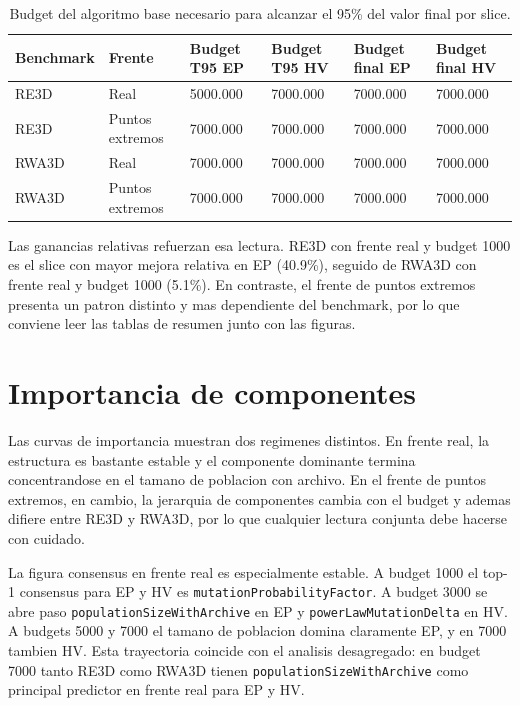 \documentclass[11pt,a4paper]{article}
\begin{document}
{\scriptsize
\begin{table}[p]
\centering
\caption{Budget del algoritmo base necesario para alcanzar el 95\% del valor final por slice.}
\label{tab:budget_t95}
\begin{tabular}{llllll}
\toprule
Benchmark & Frente & Budget T95 EP & Budget T95 HV & Budget final EP & Budget final HV \\
\midrule
RE3D & Real & 5000.000 & 7000.000 & 7000.000 & 7000.000 \\
RE3D & Puntos extremos & 7000.000 & 7000.000 & 7000.000 & 7000.000 \\
RWA3D & Real & 7000.000 & 7000.000 & 7000.000 & 7000.000 \\
RWA3D & Puntos extremos & 7000.000 & 7000.000 & 7000.000 & 7000.000 \\
\bottomrule
\end{tabular}
\end{table}

}

Las ganancias relativas refuerzan esa lectura. RE3D con frente real y budget 1000 es el slice con mayor mejora relativa en EP (40.9\%), seguido de RWA3D con frente real y budget 1000 (5.1\%). En contraste, el frente de puntos extremos presenta un patron distinto y mas dependiente del benchmark, por lo que conviene leer las tablas de resumen junto con las figuras.

\section{Importancia de componentes}

Las curvas de importancia muestran dos regimenes distintos. En frente real, la estructura es bastante estable y el componente dominante termina concentrandose en el tamano de poblacion con archivo. En el frente de puntos extremos, en cambio, la jerarquia de componentes cambia con el budget y ademas difiere entre RE3D y RWA3D, por lo que cualquier lectura conjunta debe hacerse con cuidado.

La figura consensus en frente real es especialmente estable. A budget 1000 el top-1 consensus para EP y HV es \texttt{mutationProbabilityFactor}. A budget 3000 se abre paso \texttt{populationSizeWithArchive} en EP y \texttt{powerLawMutationDelta} en HV. A budgets 5000 y 7000 el tamano de poblacion domina claramente EP, y en 7000 tambien HV. Esta trayectoria coincide con el analisis desagregado: en budget 7000 tanto RE3D como RWA3D tienen \texttt{populationSizeWithArchive} como principal predictor en frente real para EP y HV.
\end{document}
